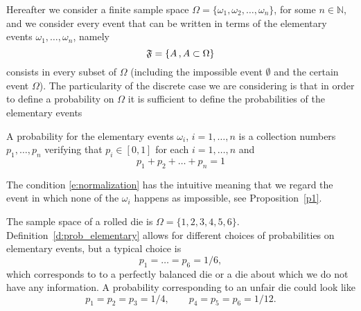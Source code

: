     Hereafter we consider a finite sample space $\Omega = \{\omega_1, \omega_2, \ldots, \omega_n\}$, for some $n  \in \mathbb N$, and we consider every event that can be written in terms of the elementary events $\omega_1, \ldots, \omega_n$, namely   
    \begin{equation}
	\label{e:f_all}
        {\mathfrak F} = \{ A \, , A \subset \Omega \}
    \end{equation}
   consists in every subset of $\Omega$ (including the impossible event $\emptyset$ and the certain event $\Omega$).  
    The particularity of the discrete case we are considering is that in order to define a probability on $\Omega$ it is sufficient to define the probabilities of the elementary events
    \begin{definition}
        \label{d:prob_elementary}
        A probability for the elementary events $\omega_i$, $i = 1, \ldots ,n$ is a collection numbers $p_1, \ldots, p_n$ verifying 
        that $p_i \in [0,1]$ for each $i = 1, \ldots, n $ and 
        \begin{equation}
        \label{e:normalization}
        p_1 + p_2 + \ldots + p_n = 1    
        \end{equation}
    \end{definition}
	The condition \eqref{e:normalization} has the intuitive meaning that we regard the event in which none of the $\omega_i$ happens as impossible, see Proposition~\ref{p1}. 
  \begin{example}
	  \label{ex:definition}
	  The sample space of a rolled die is  $\Omega = \{1,2,3,4,5,6\}$. Definition~\ref{d:prob_elementary} allows for different choices of probabilities on elementary events, but a typical choice is 
	  \begin{equation}
		  \label{e:die_uni}
		  p_1 = \ldots = p_6 = 1/6,
	  \end{equation}
	which corresponds to to a perfectly balanced die or a die about which we do not have any information.  A probability corresponding to an unfair die could look like
	  \begin{equation}
		  \label{e:die_unfair}
		  p_1 = p_2 = p_3 = 1/4,\qquad p_4 = p_5 =p_6 =1/12.
	  \end{equation}
  \end{example}

